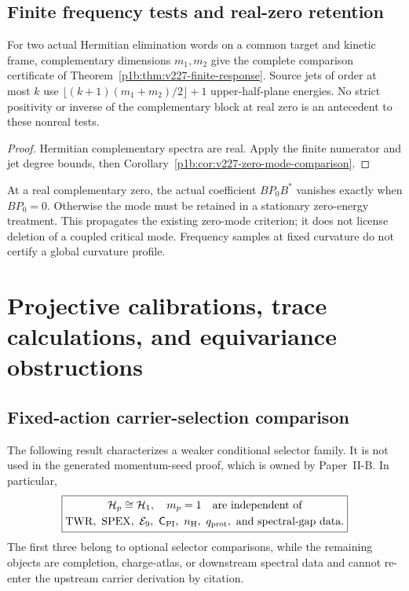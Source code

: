 \documentclass[11pt,a4paper]{article}
\begin{document}
\subsection{Finite frequency tests and real-zero retention}
\label{p2d:sec:v227-frequency-tests}
\begin{corollary}
\label{p2d:cor:v227-frequency-tests}
For two actual Hermitian elimination words on a common target and kinetic
frame, complementary dimensions $m_1,m_2$ give the complete comparison
certificate of Theorem~\ref{p1b:thm:v227-finite-response}. Source jets of
order at most $k$ use
$\lfloor(k+1)(m_1+m_2)/2\rfloor+1$ upper-half-plane energies.
No strict positivity or inverse of the complementary block at real zero
is an antecedent to these nonreal tests.
\end{corollary}
\begin{proof}
Hermitian complementary spectra are real. Apply the finite numerator and
jet degree bounds, then Corollary~\ref{p1b:cor:v227-zero-mode-comparison}.
\end{proof}
At a real complementary zero, the actual coefficient $BP_0B^*$ vanishes
exactly when $BP_0=0$. Otherwise the mode must be retained in a stationary
zero-energy treatment. This propagates the existing zero-mode criterion;
it does not license deletion of a coupled critical mode. Frequency samples
at fixed curvature do not certify a global curvature profile.



\section{Projective calibrations, trace calculations, and equivariance obstructions}
\label{p2ftech:sec:exports}

\subsection{Fixed-action carrier-selection comparison}
\label{p2e:app:legacy-selector}
The following result characterizes a weaker conditional selector family.
It is not used in the generated momentum-seed proof,
which is owned by Paper~II-B.  In particular,
\[
 \boxed{\begin{gathered}
 \mathcal H_p\cong\mathcal H_1,\quad m_p=1\quad\text{are independent of}\\
 \mathrm{TWR},\ \mathrm{SPEX},\ \mathcal E_9,\ \mathsf C_{\rm PI},\
 n_{\rm H},\ q_{\rm prot},\ \text{and spectral-gap data}.
 \end{gathered}}
\]
The first three belong to optional selector comparisons, while the remaining
objects are completion, charge-atlas, or downstream spectral data and cannot
re-enter the upstream carrier derivation by citation.
\end{document}
